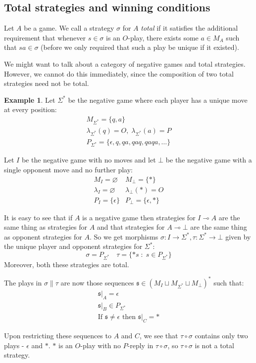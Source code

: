 \documentclass[11pt]{article} %
\theoremstyle{plain} %
\theoremstyle{definition} %
\newtheorem{example}[theorem]{Example}
\theoremstyle{note}
\theoremstyle{exercisestyle}
\newcommand*\from{\colon}
\newcommand{\cmap}[3]{#1\from{}#2\to{}#3}
\renewcommand{\implies}{\multimap}
\newcommand{\comp}[2]{#1 \circ #2}
\newcommand{\cprd}{\sqcup}
\newcommand{\suchthat}{\;\colon\;}
\newcommand{\s}{\mathfrak s}
\newcommand{\emptyplay}{\epsilon}
\newcommand{\st}{{\Sigma^*}}
\let\emptyset\varnothing
\begin{document}
\subsection{Total strategies and winning conditions}

Let $A$ be a game.  We call a strategy $\sigma$ for $A$ \emph{total} if it satisfies the additional requirement that whenever $s\in\sigma$ is an $O$-play, there exists some $a\in M_A$ such that $sa\in\sigma$ (before we only required that such a play be unique if it existed).  

We might want to talk about a category of negative games and total strategies.  However, we cannot do this immediately, since the composition of two total strategies need not be total.  

\begin{example}
  \label{TotalCompositionExample}
  Let $\st$ be the negative game where each player has a unique move at every position:
  \begin{gather*}
    M_{\st} = \{q,a\} \\
    \lambda_{\st}(q) = O,\;\lambda_{\st}(a)=P \\
    P_{\st} = \{\emptyplay, q, qa, qaq, qaqa, \dots\}
  \end{gather*}

  Let $I$ be the negative game with no moves and let $\bot$ be the negative game with a single opponent move and no further play:
  \[
    \begin{matrix}
      M_I=\emptyset & M_\bot = \{*\} \\
      \lambda_I=\emptyset  & \lambda_\bot(*)=O \\
      P_I=\{\emptyplay\} & P_\bot = \{\emptyplay, *\}
    \end{matrix}
    \]

  It is easy to see that if $A$ is a negative game then strategies for $I\implies A$ are the same thing as strategies for $A$ and that strategies for $A\implies\bot$ are the same thing as opponent strategies for $A$.  So we get morphisms $\cmap{\sigma}{I}{\st},\cmap{\tau}{\st}{\bot}$ given by the unique player and opponent strategies for $\st$:
  \[
    \sigma = P_\st\quad\tau = \{*s\suchthat s\in P_\st\}
    \]
  Moreover, both these strategies are total.

  The plays in $\sigma\|\tau$ are now those sequences $\s\in(M_I\cprd M_\st\cprd M_\bot)^*$ such that:
  \begin{gather*}
    \s\vert_A=\emptyplay \\
    \s\vert_B\in P_\st \\
    \textrm{If $\s\ne\emptyplay$ then $\s\vert_C=*$}
  \end{gather*}

  Upon restricting these sequences to $A$ and $C$, we see that $\comp\tau\sigma$ contains only two plays - $\emptyplay$ and $*$.  $*$ is an $O$-play with no $P$-reply in $\comp\tau\sigma$, so $\comp\tau\sigma$ is not a total strategy.
\end{example}
\end{document}
